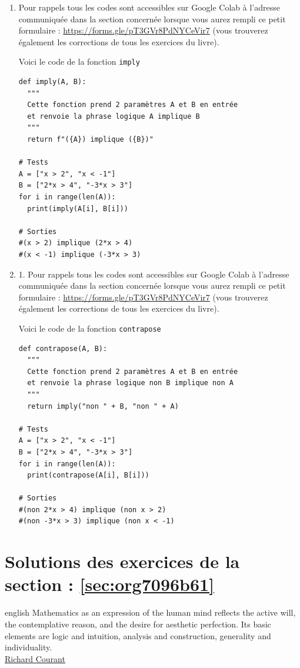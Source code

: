 \documentclass[a4paper, 11pt, twoside]{book}
\begin{document}
\begin{enumerate}
\item Pour rappels tous les codes sont accessibles sur Google Colab à
l'adresse communiquée dans la section concernée lorsque vous
aurez rempli ce petit formulaire :
\url{https://forms.gle/pT3GVr8PdNYCeVir7} (vous trouverez également
les corrections de tous les exercices du livre).

Voici le code de la fonction \texttt{imply}

\begin{verbatim}
def imply(A, B):
  """
  Cette fonction prend 2 paramètres A et B en entrée 
  et renvoie la phrase logique A implique B
  """
  return f"({A}) implique ({B})"

# Tests
A = ["x > 2", "x < -1"]
B = ["2*x > 4", "-3*x > 3"] 
for i in range(len(A)):
  print(imply(A[i], B[i]))

# Sorties
#(x > 2) implique (2*x > 4)
#(x < -1) implique (-3*x > 3)
\end{verbatim}
\item 1. Pour rappels tous les codes sont accessibles sur Google Colab à
l'adresse communiquée dans la section concernée lorsque vous
aurez rempli ce petit formulaire :
\url{https://forms.gle/pT3GVr8PdNYCeVir7} (vous trouverez également
les corrections de tous les exercices du livre).

Voici le code de la fonction \texttt{contrapose}

\begin{verbatim}
def contrapose(A, B):
  """
  Cette fonction prend 2 paramètres A et B en entrée 
  et renvoie la phrase logique non B implique non A
  """
  return imply("non " + B, "non " + A)

# Tests
A = ["x > 2", "x < -1"]
B = ["2*x > 4", "-3*x > 3"] 
for i in range(len(A)):
  print(contrapose(A[i], B[i]))

# Sorties
#(non 2*x > 4) implique (non x > 2)
#(non -3*x > 3) implique (non x < -1)
\end{verbatim}
\end{enumerate}
\stopcontents[level-2]

\chapter{Solutions des exercices de la section : \ref{sec:org7096b61}}
\label{sec:org9336dcc}
\startcontents[level-2]

\begin{foreigndisplayquote}{english}
Mathematics as an expression of the human mind reflects the active
will, the contemplative reason, and the desire for aesthetic
perfection. Its basic elements are logic and intuition, analysis
and construction, generality and individuality.\\

\href{https://en.wikipedia.org/wiki/Richard\_Courant}{Richard Courant}
\end{foreigndisplayquote}
\end{document}
